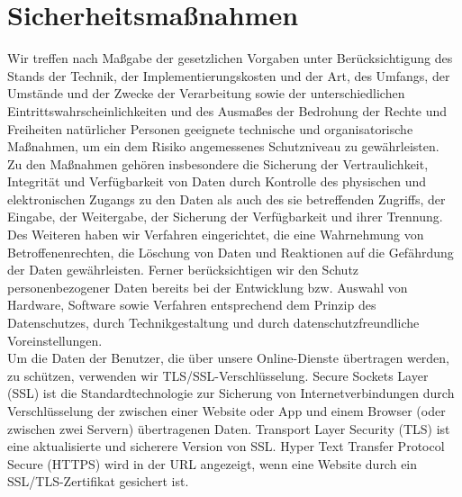 \documentclass[12pt]{article}
\begin{document}
\part{Sicherheitsmaßnahmen}
Wir treffen nach Maßgabe der gesetzlichen Vorgaben unter Berücksichtigung des Stands der Technik, der Implementierungskosten und der Art, des Umfangs, der Umstände und der Zwecke der Verarbeitung sowie der unterschiedlichen Eintrittswahrscheinlichkeiten und des Ausmaßes der Bedrohung der Rechte und Freiheiten natürlicher Personen geeignete technische und organisatorische Maßnahmen, um ein dem Risiko angemessenes Schutzniveau zu gewährleisten.\\
Zu den Maßnahmen gehören insbesondere die Sicherung der Vertraulichkeit, Integrität und Verfügbarkeit von Daten durch Kontrolle des physischen und elektronischen Zugangs zu den Daten als auch des sie betreffenden Zugriffs, der Eingabe, der Weitergabe, der Sicherung der Verfügbarkeit und ihrer Trennung. Des Weiteren haben wir Verfahren eingerichtet, die eine Wahrnehmung von Betroffenenrechten, die Löschung von Daten und Reaktionen auf die Gefährdung der Daten gewährleisten. Ferner berücksichtigen wir den Schutz personenbezogener Daten bereits bei der Entwicklung bzw. Auswahl von Hardware, Software sowie Verfahren entsprechend dem Prinzip des Datenschutzes, durch Technikgestaltung und durch datenschutzfreundliche Voreinstellungen.\\
Um die Daten der Benutzer, die über unsere Online-Dienste übertragen werden, zu schützen, verwenden wir TLS/SSL-Verschlüsselung. Secure Sockets Layer (SSL) ist die Standardtechnologie zur Sicherung von Internetverbindungen durch Verschlüsselung der zwischen einer Website oder App und einem Browser (oder zwischen zwei Servern) übertragenen Daten. Transport Layer Security (TLS) ist eine aktualisierte und sicherere Version von SSL. Hyper Text Transfer Protocol Secure (HTTPS) wird in der URL angezeigt, wenn eine Website durch ein SSL/TLS-Zertifikat gesichert ist.
\end{document}
